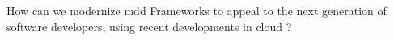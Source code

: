 How can we modernize \acrlong{mdd} Frameworks to appeal to the next generation of software developers, using recent developments in \gls{cloud} ?
